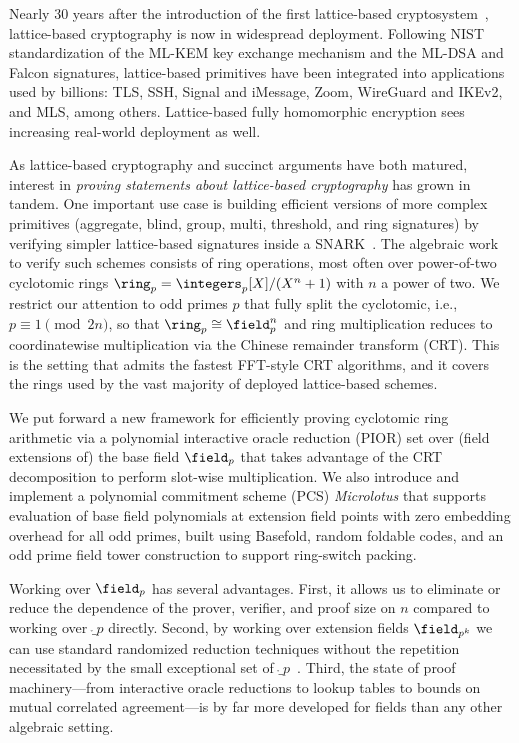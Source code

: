 Nearly $30$ years after the introduction of the first lattice-based cryptosystem~\cite{STOC:Ajtai96}, lattice-based cryptography is now in widespread deployment. Following NIST standardization of the ML-KEM key exchange mechanism and the ML-DSA and Falcon signatures, lattice-based primitives have been integrated into applications used by billions: TLS, SSH, Signal and iMessage, Zoom, WireGuard and IKEv2, and MLS, among others. Lattice-based fully homomorphic encryption sees increasing real-world deployment as well.

As lattice-based cryptography and succinct arguments have both matured, interest in \emph{proving statements about lattice-based cryptography} has grown in tandem. One important use case is building efficient versions of more complex primitives (aggregate, blind, group, multi, threshold, and ring signatures) by verifying simpler lattice-based signatures inside a SNARK~\cite{PQCRYPTO:BCOS20,AC:LyuNgu22,C:AABKT24}. The algebraic work to verify such schemes consists of ring operations, most often over power-of-two cyclotomic rings $\ring_p = \integers_p[X]/(X^n + 1)$ with $n$ a power of two. We restrict our attention to odd primes $p$ that fully split the cyclotomic, i.e., $p \equiv 1 \pmod{2n}$, so that $\ring_p \cong \field_p^n$ and ring multiplication reduces to coordinatewise multiplication via the Chinese remainder transform (CRT). This is the setting that admits the fastest FFT-style CRT algorithms, and it covers the rings used by the vast majority of deployed lattice-based schemes.

We put forward a new framework for efficiently proving cyclotomic ring arithmetic via a polynomial interactive oracle reduction (PIOR) set over (field extensions of) the base field $\field_p$ that takes advantage of the CRT decomposition to perform slot-wise multiplication. We also introduce and implement a polynomial commitment scheme (PCS) \emph{Microlotus} that supports evaluation of base field polynomials at extension field points with zero embedding overhead for all odd primes, built using Basefold, random foldable codes, and an odd prime field tower construction to support ring-switch packing.

Working over $\field_p$ has several advantages. First, it allows us to eliminate or reduce the dependence of the prover, verifier, and proof size on $n$ compared to working over $\ring_p$ directly. Second, by working over extension fields $\field_{p^k}$ we can use standard randomized reduction techniques without the repetition necessitated by the small exceptional set of $\ring_p$~\cite{C:AlbLai21}. Third, the state of proof machinery---from interactive oracle reductions to lookup tables to bounds on mutual correlated agreement---is by far more developed for fields than any other algebraic setting.

